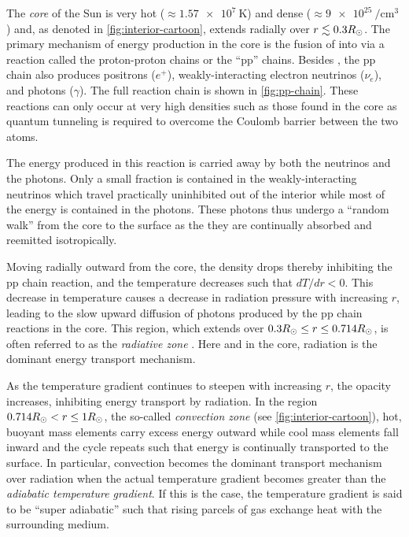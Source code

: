 The \textit{core} of the Sun is very hot ($\approx\SI{1.57e7}{\kelvin}$) and dense ($\approx\SI{9e25}{\per\cubic\cm}$) \citep{carroll_introduction_2007,bahcall_solar_2001} and, as denoted in \autoref{fig:interior-cartoon}, extends radially over $r\lesssim 0.3R_\odot$. The primary mechanism of energy production in the core is the fusion of  into  via a reaction called the proton-proton chains or the ``pp'' chains. Besides , the pp chain also produces positrons ($e^+$), weakly-interacting electron neutrinos ($\nu_e$), and photons ($\gamma$). The full reaction chain is shown in \autoref{fig:pp-chain}. These reactions can only occur at very high densities such as those found in the core as quantum tunneling is required to overcome the Coulomb barrier between the two  atoms.

The energy produced in this reaction is carried away by both the neutrinos and the photons. Only a small fraction is contained in the weakly-interacting neutrinos which travel practically uninhibited out of the interior while most of the energy is contained in the photons. These photons thus undergo a ``random walk'' from the core to the surface as the they are continually absorbed and reemitted isotropically. 

Moving radially outward from the core, the density drops thereby inhibiting the pp chain reaction, and the temperature decreases such that $dT/dr < 0$. This decrease in temperature causes a decrease in radiation pressure with increasing $r$, leading to the slow upward diffusion of photons produced by the pp chain reactions in the core. This region, which extends over $0.3R_\odot\le r\le 0.714R_\odot$, is often referred to as the \textit{radiative zone} \citep{carroll_introduction_2007}. Here and in the core, radiation is the dominant energy transport mechanism.

As the temperature gradient continues to steepen with increasing $r$, the opacity increases, inhibiting energy transport by radiation. In the region $0.714R_\odot<r\le1R_\odot$, the so-called \textit{convection zone} (see \autoref{fig:interior-cartoon}), hot, buoyant mass elements carry excess energy outward while cool mass elements fall inward and the cycle repeats such that energy is continually transported to the surface. In particular, convection becomes the dominant transport mechanism over radiation when the actual temperature gradient becomes greater than the \textit{adiabatic temperature gradient}. If this is the case, the temperature gradient is said to be ``super adiabatic'' \citep[see Section 10.4 of][]{carroll_introduction_2007} such that rising parcels of gas exchange heat with the surrounding medium.

